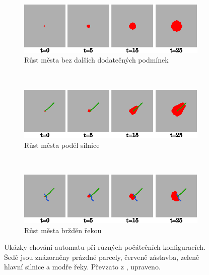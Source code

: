 \begin{figure}
    \begin{subfigure}{0.9\textwidth}
      \includegraphics[width=\textwidth]{genimg-urban-growt-transitions-1}
      \caption{Růst města bez dalších dodatečných podmínek} 
    \end{subfigure}
    \\
    \begin{subfigure}{0.9\textwidth}
      \includegraphics[width=\textwidth]{genimg-urban-growt-transitions-2}
      \caption{Růst města podél silnice} 
    \end{subfigure}
    \\
    \begin{subfigure}{0.9\textwidth}
      \includegraphics[width=\textwidth]{genimg-urban-growt-transitions-3}
      \caption{Růst města bržděn řekou} 
    \end{subfigure}

    \caption[Princip automatu pro problém městského růstu]{Ukázky chování automatu při různých počátečních konfiguracích. Šedě jsou znázorněny prázdné parcely, červeně zástavba, zeleně hlavní silnice a modře řeky. Převzato z \cite{LiuPhi-DevCelAutModUrbGroIncFuzSetApp}, upraveno.} \label{img:VarTransRuls}
\end{figure}

